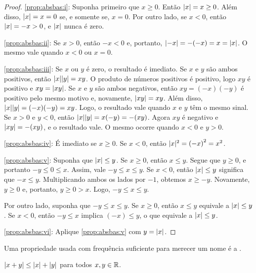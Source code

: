 \begin{proof}
\ref{prop:absbas:i}:
Suponha primeiro que $x \geq 0$.
Então $\lvert {x} \rvert = x \geq 0$. Além disso, $\lvert {x} \rvert = x = 0$ se, e somente
se, $x=0$.
Por outro lado, se $x < 0$, então $\lvert {x} \rvert = -x > 0$, e $\lvert {x} \rvert$ nunca é zero.

\medskip

\ref{prop:absbas:ii}: Se $x > 0$, então $-x < 0$ e, portanto, $\lvert {-x} \rvert = -(-x) = x =
\lvert {x} \rvert$. O mesmo vale quando $x < 0$ ou $x = 0$.

\medskip

\ref{prop:absbas:iii}:
Se $x$ ou $y$ é zero, o resultado é imediato. Se $x$ e
$y$ são ambos positivos, então $\lvert {x} \rvert\lvert {y} \rvert = xy$. O produto de números
positivos é positivo, logo $xy$ é
positivo e $xy = \lvert {xy} \rvert$.
Se $x$ e $y$ são ambos negativos,
então $xy=(-x)(-y)$ é positivo pelo mesmo motivo e, novamente, $\lvert {xy} \rvert=xy$. Além disso,
$\lvert {x} \rvert\lvert {y} \rvert = (-x)(-y) = xy$.
Logo, o resultado vale quando $x$ e $y$ têm o mesmo sinal.
Se $x > 0$ e $y < 0$, então $\lvert {x} \rvert\lvert {y} \rvert = x(-y) = -(xy)$. Agora
$xy$ é negativo e $\lvert {xy} \rvert = -(xy)$, e o resultado vale. O mesmo ocorre quando
$x < 0$ e $y > 0$.

\medskip

\ref{prop:absbas:iv}:
É imediato se $x \geq 0$. Se $x < 0$, então $\lvert {x} \rvert^2 = {(-x)}^2 =
x^2$.

\medskip

\ref{prop:absbas:v}:
Suponha que $\lvert {x} \rvert \leq y$.
Se $x \geq 0$, então $x \leq y$.
Segue que $y \geq 0$, e portanto $-y \leq 0 \leq x$.
Assim, vale $-y \leq x \leq y$.
Se $x < 0$, então $\lvert {x} \rvert \leq y$ significa que $-x \leq y$.
Multiplicando ambos os lados por $-1$, obtemos $x \geq -y$.
Novamente, $y \geq 0$ e, portanto, $y \geq 0 > x$.
Logo, $-y \leq x \leq y$.

Por outro lado, suponha que $-y \leq x \leq y$.
Se $x \geq 0$, então $x \leq y$ equivale a $\lvert {x} \rvert \leq y$.
Se $x < 0$, então $-y \leq x$ implica $(-x) \leq y$,
o que equivale a $\lvert {x} \rvert \leq y$.

\medskip

\ref{prop:absbas:vi}:
Aplique \ref{prop:absbas:v} com $y = \lvert {x} \rvert$.
\end{proof}

Uma propriedade usada com frequência suficiente para merecer um nome é a
\emph{}.

\begin{prop}
$\lvert {x+y} \rvert \leq \lvert {x} \rvert+\lvert {y} \rvert$
para todos $x, y \in {\mathbb{R}}$.
\end{prop}

